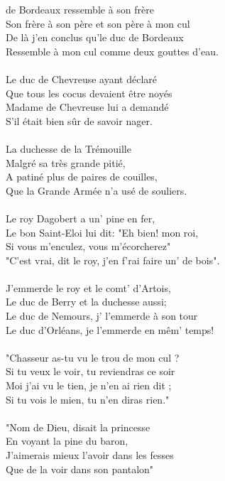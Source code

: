 %
 de Bordeaux ressemble à son frère
\\Son frère à son père et son père à mon cul
\\De là j'en conclus qu'le duc de Bordeaux
\\Ressemble à mon cul comme deux gouttes d'eau.
\\\\Le duc de Chevreuse ayant déclaré
\\Que tous les cocus devaient être noyés
\\Madame de Chevreuse lui a demandé
\\S'il était bien sûr de savoir nager.
\\\\La duchesse de la Trémouille
\\Malgré sa très grande pitié,
\\A patiné plus de paires de couilles,
\\Que la Grande Armée n'a usé de souliers.
\\\\Le roy Dagobert a un' pine en fer,
\\Le bon Saint-Eloi lui dit: "Eh bien! mon roi,
\\Si vous m'enculez, vous m'écorcherez"
\\"C'est vrai, dit le roy, j'en f'rai faire un' de bois".
\\\\J'emmerde le roy et le comt' d'Artois,
\\Le duc de Berry et la duchesse aussi;
\\Le duc de Nemours, j' l'emmerde à son tour
\\Le duc d'Orléans, je l'emmerde en mêm' temps!
\\\\"Chasseur as-tu vu le trou de mon cul ?
\\Si tu veux le voir, tu reviendras ce soir
\\Moi j'ai vu le tien, je n'en ai rien dit ;
\\Si tu vois le mien, tu n'en diras rien."
\\\\"Nom de Dieu, disait la princesse
\\En voyant la pine du baron,
\\J'aimerais mieux l'avoir dans les fesses
\\Que de la voir dans son pantalon"

\breakpage